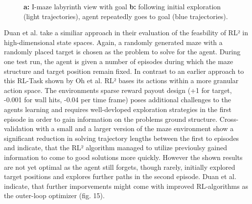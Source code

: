 \documentclass[letterpaper, 10 pt, conference]{ieeeconf}  %
\begin{document}
\begin{figure}[thpb]
        \centering
  \caption{\textbf{a:} I-maze labyrinth view with goal \newline
  \textbf{b:} following initial exploration
  (light trajectories), agent repeatedly goes to goal (blue trajectories). \cite{wangLearningReinforcementLearn2016}
  }
        \label{figurelabel}
     \end{figure}

Duan et al.\cite{duanRLFastReinforcement2016} take a similiar approach in their 
evaluation of the feasbility of RL² in high-dimensional state spaces. Again, a randomly generated 
maze with a randomly placed target is chosen as the problem to solve for the agent. During one test run, the agent is given a number 
of episodes during which the maze structure and target position remain fixed. In contrast to an earlier approach to this RL-Task shown by Oh et al.
\cite{ohZeroShotTaskGeneralization2017} 
RL² bases its actions within a more granular action space. The environments sparse reward payout design (+1 for target, 
-0.001 for wall hits, -0.04 per time frame) poses additional challenges to the agents learning and requires well-devloped exploration strategies 
in the first episode in order to gain information on the problems ground structure. Cross-validation with a small and a larger version of the 
maze environment show a significant reduction in solving trajectory lengths between the first to episodes and indicate, that the RL² algorithm 
managed to utilize previoulsy gained information to come to good solutions more quickly. However the shown results are not yet optimal
as the agent still forgets, though rarely, initially explored target positions and explores further paths in the second episode. Duan et al. 
indicate, that further imporvements might come with improved RL-algorithms as the outer-loop optimizer (fig. 15). 
\end{document}

